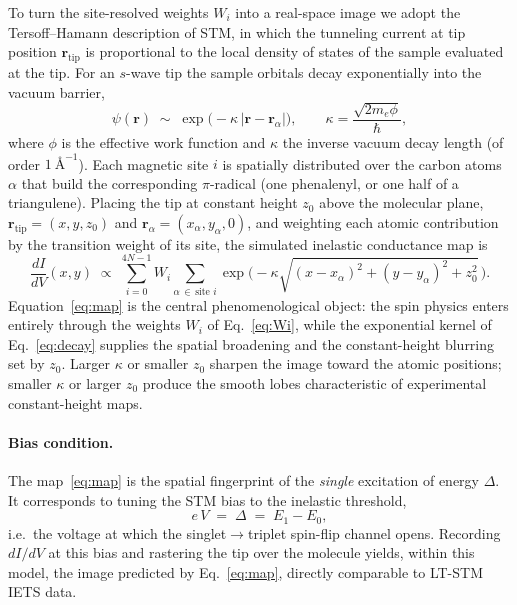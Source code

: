 \documentclass[11pt,a4paper]{article}
\renewcommand{\vec}[1]{\mathbf{#1}}
\begin{document}
To turn the site-resolved weights $W_i$ into a real-space image we adopt the
Tersoff--Hamann description of STM, in which the tunneling current at tip
position $\vec r_{\text{tip}}$ is proportional to the local density of states of
the sample evaluated at the tip. For an $s$-wave tip the sample orbitals decay
exponentially into the vacuum barrier,
\begin{equation}
  \psi(\vec r)\;\sim\;\exp\!\big(-\kappa\,|\vec r-\vec r_{\alpha}|\big),
  \qquad
  \kappa=\frac{\sqrt{2m_e\phi}}{\hbar},
  \label{eq:decay}
\end{equation}
where $\phi$ is the effective work function and $\kappa$ the inverse vacuum decay
length (of order $1~\text{\AA}^{-1}$). Each magnetic site $i$ is spatially
distributed over the carbon atoms $\alpha$ that build the corresponding
$\pi$-radical (one phenalenyl, or one half of a triangulene). Placing the tip at
constant height $z_0$ above the molecular plane, $\vec r_{\text{tip}}=(x,y,z_0)$
and $\vec r_\alpha=(x_\alpha,y_\alpha,0)$, and weighting each atomic contribution
by the transition weight of its site, the simulated inelastic conductance map is
\begin{equation}
  \boxed{\;
  \frac{dI}{dV}(x,y)\;\propto\;
    \sum_{i=0}^{4N-1} W_i
    \sum_{\alpha\,\in\,\text{site }i}
    \exp\!\Big(-\kappa\sqrt{(x-x_\alpha)^2+(y-y_\alpha)^2+z_0^2}\,\Big).
  \;}
  \label{eq:map}
\end{equation}
Equation~\eqref{eq:map} is the central phenomenological object: the spin physics
enters entirely through the weights $W_i$ of Eq.~\eqref{eq:Wi}, while the
exponential kernel of Eq.~\eqref{eq:decay} supplies the spatial broadening and the
constant-height blurring set by $z_0$. Larger $\kappa$ or smaller $z_0$ sharpen
the image toward the atomic positions; smaller $\kappa$ or larger $z_0$ produce
the smooth lobes characteristic of experimental constant-height maps.

\paragraph{Bias condition.}
The map~\eqref{eq:map} is the spatial fingerprint of the \emph{single}
excitation of energy $\Delta$. It corresponds to tuning the STM bias to the
inelastic threshold,
\begin{equation}
  e\,V \;=\; \Delta \;=\; E_1-E_0,
\end{equation}
i.e.\ the voltage at which the singlet$\rightarrow$triplet spin-flip channel
opens. Recording $dI/dV$ at this bias and rastering the tip over the molecule
yields, within this model, the image predicted by Eq.~\eqref{eq:map}, directly
comparable to LT-STM IETS data.
\end{document}
